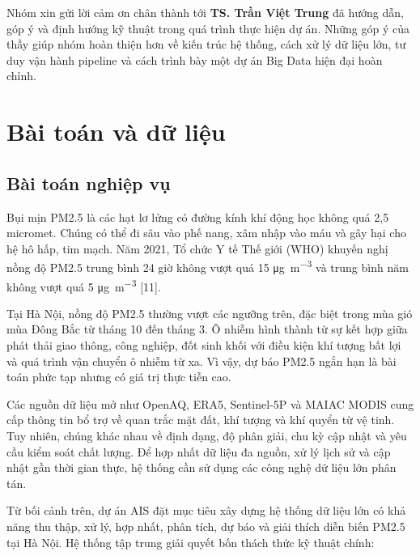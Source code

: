 \documentclass[12pt,a4paper]{article}
\begin{document}
Nhóm xin gửi lời cảm ơn chân thành tới \textbf{TS. Trần Việt Trung} đã hướng dẫn, góp ý và định hướng kỹ thuật trong quá trình thực hiện dự án. Những góp ý của thầy giúp nhóm hoàn thiện hơn về kiến trúc hệ thống, cách xử lý dữ liệu lớn, tư duy vận hành pipeline và cách trình bày một dự án Big Data hiện đại hoàn chỉnh.

\newpage
\section{Bài toán và dữ liệu}\label{buxe0i-touxe1n-vuxe0-dux1eef-liux1ec7u}

\subsection{Bài toán nghiệp vụ}\label{ux111ux1ecbnh-nghux129a-buxe0i-touxe1n}

Bụi mịn PM2.5 là các hạt lơ lửng có đường kính khí động học không quá 2,5 micromet. Chúng có thể đi sâu vào phế nang, xâm nhập vào máu và gây hại cho hệ hô hấp, tim mạch. Năm 2021, Tổ chức Y tế Thế giới (WHO) khuyến nghị nồng độ PM2.5 trung bình 24 giờ không vượt quá 15 \si{\micro\gram\per\meter\cubed} và trung bình năm không vượt quá 5 \si{\micro\gram\per\meter\cubed} {[}11{]}.

Tại Hà Nội, nồng độ PM2.5 thường vượt các ngưỡng trên, đặc biệt trong mùa gió mùa Đông Bắc từ tháng 10 đến tháng 3. Ô nhiễm hình thành từ sự kết hợp giữa phát thải giao thông, công nghiệp, đốt sinh khối với điều kiện khí tượng bất lợi và quá trình vận chuyển ô nhiễm từ xa. Vì vậy, dự báo PM2.5 ngắn hạn là bài toán phức tạp nhưng có giá trị thực tiễn cao.

Các nguồn dữ liệu mở như OpenAQ, ERA5, Sentinel-5P và MAIAC MODIS cung cấp thông tin bổ trợ về quan trắc mặt đất, khí tượng và khí quyển từ vệ tinh. Tuy nhiên, chúng khác nhau về định dạng, độ phân giải, chu kỳ cập nhật và yêu cầu kiểm soát chất lượng. Để hợp nhất dữ liệu đa nguồn, xử lý lịch sử và cập nhật gần thời gian thực, hệ thống cần sử dụng các công nghệ dữ liệu lớn phân tán.

Từ bối cảnh trên, dự án AIS đặt mục tiêu xây dựng hệ thống dữ liệu lớn có khả năng thu thập, xử lý, hợp nhất, phân tích, dự báo và giải thích diễn biến PM2.5 tại Hà Nội. Hệ thống tập trung giải quyết bốn thách thức kỹ thuật chính:
\end{document}
